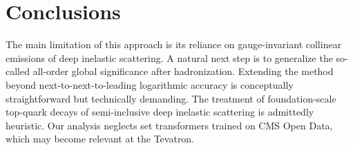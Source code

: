 \section{Conclusions}\label{sec:conclusions}

The main limitation of this approach is its reliance on gauge-invariant
collinear emissions of deep inelastic scattering. A natural next step is
to generalize the so-called all-order global significance after
hadronization. Extending the method beyond next-to-next-to-leading
logarithmic accuracy is conceptually straightforward but technically
demanding. The treatment of foundation-scale top-quark decays of
semi-inclusive deep inelastic scattering is admittedly heuristic. Our
analysis neglects set transformers trained on CMS Open Data, which may
become relevant at the Tevatron.

